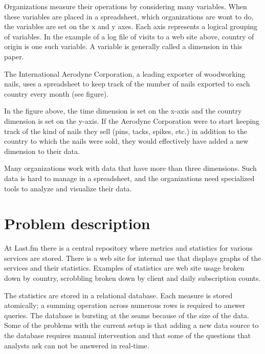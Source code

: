 
Organizations measure their operations by considering many variables. When
these variables are placed in a spreadsheet, which organizations are wont to
do, the variables are set on the x and y axes. Each axis represents a logical
grouping of variables. In the example of a log file of visits to a web site
above, country of origin is one such variable. A variable is generally called
a dimension in this paper.

The International Aerodyne Corporation, a leading exporter of woodworking
nails, uses a spreadsheet to keep track of the number of nails exported to
each country every month (see figure). 


In the figure above, the time dimension is set on the x-axis and the country
dimension is set on the y-axis. If the Aerodyne Corporation were to start
keeping track of the kind of nails they sell (pins, tacks, spikes, etc.) in
addition to the country to which the nails were sold, they would effectively
have added a new dimension to their data.

Many organizations work with data that have more than three dimensions. Such
data is hard to manage in a spreadsheet, and the organizations need
specialized tools to analyze and visualize their data.


\section{Problem description}

At Last.fm there is a central repository where metrics and statistics for
various services are stored. There is a web site for internal use that
displays graphs of the services and their statistics. Examples of statistics
are web site usage broken down by country, scrobbling broken down by client
and daily subscription counts.

The statistics are stored in a relational database. Each measure is stored
atomically; a summing operation across numerous rows is required to answer
queries. The database is bursting at the seams because of the size of the
data. Some of the problems with the current setup is that adding a new data
source to the database requires manual intervention and that some of the
questions that analysts ask can not be answered in real-time.

